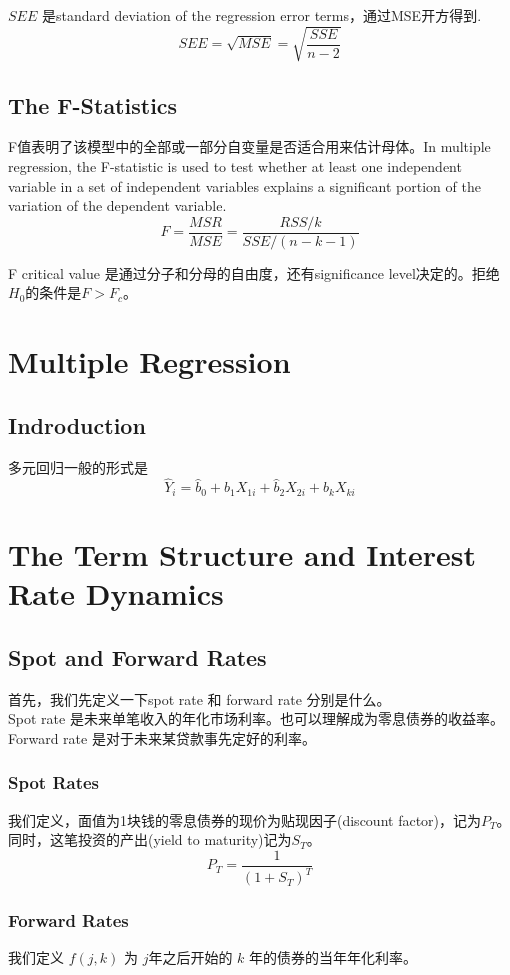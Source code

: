 \documentclass[cn,11pt,chinese]{elegantbook}
\begin{document}
    \(SEE\) 是standard deviation of the regression error terms，通过MSE开方得到.
    \[SEE = \sqrt{MSE} = \sqrt{\frac{SSE}{n - 2}}\]

\section{The F-Statistics}
    F值表明了该模型中的全部或一部分自变量是否适合用来估计母体。In multiple regression, the F-statistic is used to test whether at least one independent variable in a set of independent variables explains a significant portion of the variation of the dependent variable.
    \[F = \frac{MSR}{MSE} = \frac{RSS / k}{SSE / (n - k - 1)}\]

    F critical value 是通过分子和分母的自由度，还有significance level决定的。拒绝\(H_0\)的条件是\(F > F_c\)。

\chapter{Multiple Regression}
\section{Indroduction}
    多元回归一般的形式是 \[\hat Y_i = \hat b_0 + \hat b_1 X_{1i} + \hat b_2 X_{2i} + \hat b_k X_{ki}\]

\chapter{The Term Structure and Interest Rate Dynamics}
\section{Spot and Forward Rates}
    首先，我们先定义一下spot rate 和 forward rate 分别是什么。\\
    Spot rate 是未来单笔收入的年化市场利率。也可以理解成为零息债券的收益率。\\
    Forward rate 是对于未来某贷款事先定好的利率。

    \subsection{Spot Rates}
        我们定义，面值为1块钱的零息债券的现价为贴现因子(discount factor)，记为\(P_T\)。同时，这笔投资的产出(yield to maturity)记为\(S_T\)。
            \[P_T = \frac{1}{(1 + S_T)^T}\]
    
    \subsection{Forward Rates}
        我们定义 \(f(j,k) \) 为 \(j\)年之后开始的 \(k\) 年的债券的当年年化利率。\\
        
        
\end{document}
